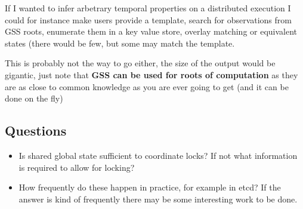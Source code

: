 If I wanted to infer arbetrary temporal properties on a distributed execution I
could for instance make users provide a template, search for observations from
GSS roots, enumerate them in a key value store, overlay matching or equivalent
states (there would be few, but some may match the template.

This is probably not the way to go either, the size of the output would be
gigantic, just note that \textbf{GSS can be used for roots of computation} as
they are as close to common knowledge as you are ever going to get (and it can
be done on the fly)

\subsection{Questions}

\begin{itemize}

\item Is shared global state sufficient to coordinate locks? If not what
information is required to allow for locking?

\item How frequently do these happen in practice, for example in etcd? If the
answer is kind of frequently there may be some interesting work to be done.

\end{itemize}




